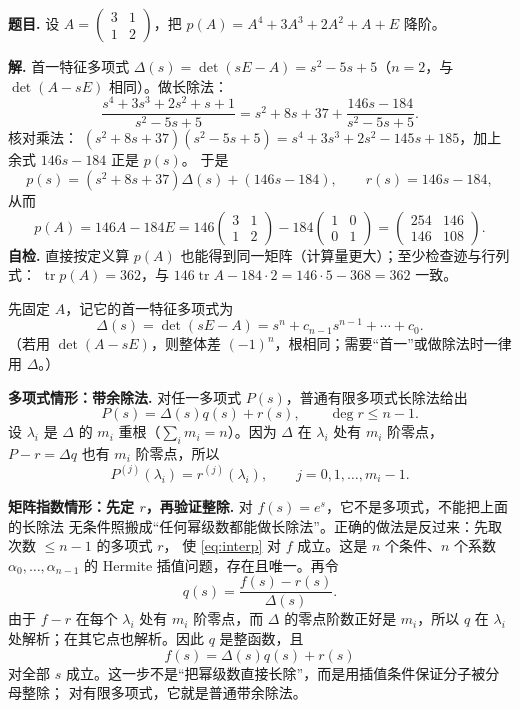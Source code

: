 \documentclass[11pt]{ctexart}
\newcommand{\pmat}[1]{\begin{pmatrix}#1\end{pmatrix}}
\begin{document}
\clearpage
{}

\textbf{题目.} 设 $A=\pmat{3&1\\1&2}$，把 $p(A)=A^4+3A^3+2A^2+A+E$ 降阶。

\textbf{解.} 首一特征多项式 $\Delta(s)=\det(sE-A)=s^2-5s+5$（$n=2$，与 $\det(A-sE)$ 相同）。做长除法：
\[
\frac{s^4+3s^3+2s^2+s+1}{s^2-5s+5}
=s^2+8s+37+\frac{146s-184}{s^2-5s+5}.
\]
核对乘法：
$(s^2+8s+37)(s^2-5s+5)=s^4+3s^3+2s^2-145s+185$，加上余式 $146s-184$ 正是 $p(s)$。
于是
\[
p(s)=(s^2+8s+37)\Delta(s)+(146s-184),\qquad r(s)=146s-184,
\]
从而
\[
p(A)=146A-184E
=146\pmat{3&1\\1&2}-184\pmat{1&0\\0&1}
=\pmat{254&146\\146&108}.
\]
\textbf{自检.} 直接按定义算 $p(A)$ 也能得到同一矩阵（计算量更大）；至少检查迹与行列式：
$\operatorname{tr}p(A)=362$，与 $146\operatorname{tr}A-184\cdot2=146\cdot5-368=362$ 一致。


先固定 $A$，记它的首一特征多项式为
\[
\Delta(s)=\det(sE-A)=s^n+c_{n-1}s^{n-1}+\cdots+c_0 .
\]
（若用 $\det(A-sE)$，则整体差 $(-1)^n$，根相同；需要“首一”或做除法时一律用 $\Delta$。）

\textbf{多项式情形：带余除法.} 对任一多项式 $P(s)$，普通有限多项式长除法给出
\[
P(s)=\Delta(s)q(s)+r(s),\qquad \deg r\le n-1 .
\]
设 $\lambda_i$ 是 $\Delta$ 的 $m_i$ 重根（$\sum_i m_i=n$）。因为 $\Delta$ 在 $\lambda_i$ 处有
$m_i$ 阶零点，$P-r=\Delta q$ 也有 $m_i$ 阶零点，所以
\begin{equation}\label{eq:interp}
P^{(j)}(\lambda_i)=r^{(j)}(\lambda_i),\qquad j=0,1,\dots,m_i-1 .
\end{equation}

\textbf{矩阵指数情形：先定 $r$，再验证整除.} 对 $f(s)=e^s$，它不是多项式，不能把上面的长除法
无条件照搬成“任何幂级数都能做长除法”。正确的做法是反过来：先取次数 $\le n-1$ 的多项式 $r$，
使 \eqref{eq:interp} 对 $f$ 成立。这是 $n$ 个条件、$n$ 个系数 $\alpha_0,\dots,\alpha_{n-1}$ 的
Hermite 插值问题，存在且唯一。再令
\[
q(s)=\frac{f(s)-r(s)}{\Delta(s)} .
\]
由于 $f-r$ 在每个 $\lambda_i$ 处有 $m_i$ 阶零点，而 $\Delta$ 的零点阶数正好是 $m_i$，所以 $q$ 在
$\lambda_i$ 处解析；在其它点也解析。因此 $q$ 是整函数，且
\begin{equation}\label{eq:div}
f(s)=\Delta(s)q(s)+r(s)
\end{equation}
对全部 $s$ 成立。这一步不是“把幂级数直接长除”，而是用插值条件保证分子被分母整除；
对有限多项式，它就是普通带余除法。
\end{document}
